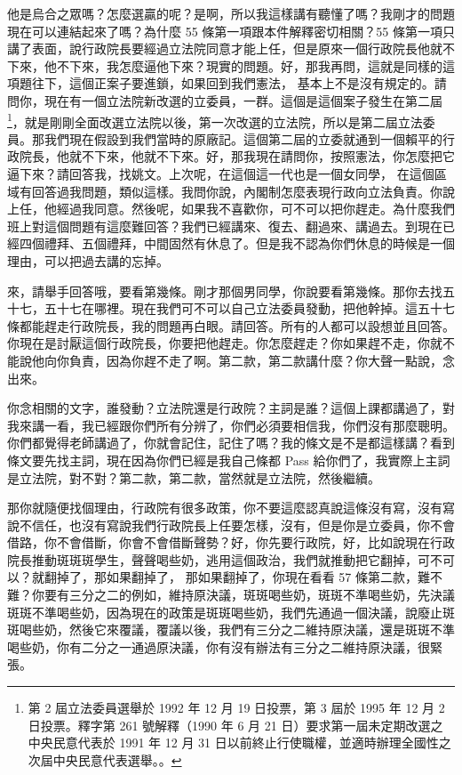 \hypertarget{c08:cue:22}{}他是烏合之眾嗎？怎麼選贏的呢？是啊，所以我這樣講有聽懂了嗎？我剛才的問題現在可以連結起來了嗎？為什麼 55 條第一項跟本件解釋密切相關？55 條第一項只講了表面，說行政院長要經過立法院同意才能上任，但是原來一個行政院長他就不下來，他不下來，我怎麼逼他下來？現實的問題。好，那我再問，這就是同樣的這項題往下，這個正案子要進鎖，如果回到我們憲法，
\hypertarget{c08:cue:23}{}基本上不是沒有規定的。請問你，現在有一個立法院新改選的立委員，一群。這個是這個案子發生在第二屆\footnote{第 2 屆立法委員選舉於 1992 年 12 月 19 日投票，第 3 屆於 1995 年 12 月 2 日投票。釋字第 261 號解釋（1990 年 6 月 21 日）要求第一屆未定期改選之中央民意代表於 1991 年 12 月 31 日以前終止行使職權，並適時辦理全國性之次屆中央民意代表選舉。\cite{jy261}。}，就是剛剛全面改選立法院以後，第一次改選的立法院，所以是第二屆立法委員。那我們現在假設到我們當時的原廠記。這個第二屆的立委就通到一個賴平的行政院長，他就不下來，他就不下來。好，那我現在請問你，按照憲法，你怎麼把它逼下來？請回答我，找姚文。上次呢，在這個這一代也是一個女同學，
\hypertarget{c08:cue:24}{}在這個區域有回答過我問題，類似這樣。我問你說，內閣制怎麼表現行政向立法負責。你說上任，他經過我同意。然後呢，如果我不喜歡你，可不可以把你趕走。為什麼我們班上對這個問題有這麼難回答？我們已經講來、復去、翻過來、講過去。到現在已經四個禮拜、五個禮拜，中間固然有休息了。但是我不認為你們休息的時候是一個理由，可以把過去講的忘掉。

\hypertarget{c08:cue:25}{}來，請舉手回答哦，要看第幾條。剛才那個男同學，你說要看第幾條。那你去找五十七，五十七在哪裡。現在我們可不可以自己立法委員發動，把他幹掉。這五十七條都能趕走行政院長，我的問題再白眼。請回答。所有的人都可以設想並且回答。你現在是討厭這個行政院長，你要把他趕走。你怎麼趕走？你如果趕不走，你就不能說他向你負責，因為你趕不走了啊。第二款，第二款講什麼？你大聲一點說，念出來。

\hypertarget{c08:cue:26}{}你念相關的文字，誰發動？立法院還是行政院？主詞是誰？這個上課都講過了，對我來講一看，我已經跟你們所有分辨了，你們必須要相信我，你們沒有那麼聰明。你們都覺得老師講過了，你就會記住，記住了嗎？我的條文是不是都這樣講？看到條文要先找主詞，現在因為你們已經是我自己條都 Pass 給你們了，我實際上主詞是立法院，對不對？第二款，第二款，當然就是立法院，然後繼續。

\hypertarget{c08:cue:27}{}那你就隨便找個理由，行政院有很多政策，你不要這麼認真說這條沒有寫，沒有寫說不信任，也沒有寫說我們行政院長上任要怎樣，沒有，但是你是立委員，你不會借路，你不會借斷，你會不會借斷聲勢？好，你先要行政院，好，比如說現在行政院長推動斑斑斑學生，聲聲喝些奶，逃用這個政治，我們就推動把它翻掉，可不可以？就翻掉了，那如果翻掉了，
\hypertarget{c08:cue:28}{}那如果翻掉了，你現在看看 57 條第二款，難不難？你要有三分之二的例如，維持原決議，斑斑喝些奶，斑斑不準喝些奶，先決議斑斑不準喝些奶，因為現在的政策是斑斑喝些奶，我們先通過一個決議，說廢止斑斑喝些奶，然後它來覆議，覆議以後，我們有三分之二維持原決議，還是斑斑不準喝些奶，你有二分之一通過原決議，你有沒有辦法有三分之二維持原決議，很緊張。

